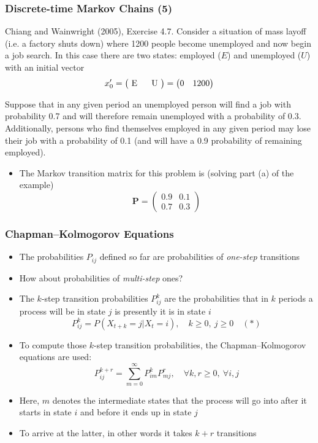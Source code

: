 \documentclass[10pt]{beamer}
\theoremstyle{definition}
\begin{document}
\begin{frame}[fragile]
	\frametitle{Discrete-time Markov Chains (5)}
	\begin{exampleblock}{Chiang and Wainwright (2005), Exercise 4.7.}
		Consider a situation of mass layoff (i.e. a factory shuts down) where 1200 people become unemployed and now begin a job search. In this case there are two states: employed ($ E $) and unemployed ($ U $) with an initial vector
		\[
		x_{0}' = 
		\begin{pmatrix}
			$ E $ & $ U $
		\end{pmatrix} =
		\begin{pmatrix}
			0 & 1200
		\end{pmatrix}
		\]
		
		Suppose that in any given period an unemployed person will find a job with probability 0.7 and will therefore remain unemployed with a probability of 0.3. Additionally, persons who find themselves employed in any given period may lose their job with a probability of 0.1 (and will have a 0.9 probability of remaining employed).
	\end{exampleblock}
	\begin{itemize}
		\item The Markov transition matrix for this problem is (solving part (a) of the example)
		\[
		\mathbf{P} = 
		\begin{pmatrix}
			0.9 & 0.1\\
			0.7 & 0.3
		\end{pmatrix}
		\]
	\end{itemize}
\end{frame}

\begin{frame}[fragile]
	\frametitle{Chapman–Kolmogorov Equations}
	\begin{itemize}
		\item The probabilities $ P_{ij} $ defined so far are probabilities of \textit{one-step} transitions
		
		\item How about probabilities of \textit{multi-step} ones?
		
		\item The $ k $-step transition probabilities $ P_{ij}^{k} $ are the probabilities that in $ k $ periods a process will be in state $ j $ is presently it is in state $ i $
		\[
			P_{ij}^{k} = P(X_{t+k} = j | X_{t} = i), \quad k \geq 0, \ j \geq 0 \quad (*)
		\]
		
		\item To compute those $ k $-step transition probabilities, the Chapman–Kolmogorov equations are used:
		\[
			P_{ij}^{k + r} = \sum_{m = 0}^{\infty} P_{im}^{k}P_{mj}^{r}, \quad \forall k, r \geq 0, \ \forall i,j
		\]
		
		\item Here, $ m $ denotes the intermediate states that the process will go into after it starts in state $ i $ and before it ends up in state $ j $
		
		\item To arrive at the latter, in other words it takes $ k + r $ transitions
	\end{itemize}
\end{frame}
\end{document}
